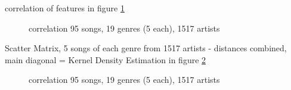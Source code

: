 correlation of features in figure \ref{fig:corr2}\\
\begin{figure}[htbp]
	\centering
	\caption{correlation 95 songs, 19 genres (5 each), 1517 artists}
	\label{fig:corr2}
\end{figure}
\FloatBarrier

\noindent Scatter Matrix, 5 songs of each genre from 1517 artists - distances combined, main diagonal = Kernel Density Estimation in figure \ref{fig:corr3}
\begin{figure}[htbp]
	\centering
	\caption{correlation 95 songs, 19 genres (5 each), 1517 artists}
	\label{fig:corr3}
\end{figure}
\FloatBarrier

